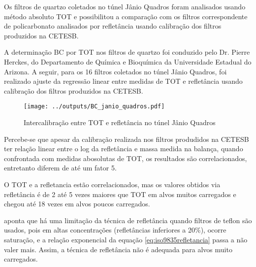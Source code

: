 Os filtros de quartzo coletados no túnel Jânio Quadros foram analisados usando
método absoluto TOT e possibilitou a comparação com os filtros correspondente 
de policarbonato analisados por refletância usando calibração dos filtros
produzidos na CETESB. 

A determinação BC por TOT nos filtros de quartzo foi conduzido pelo 
Dr. Pierre Herckes, do Departamento de Química e Bioquímica da 
Universidade Estadual do Arizona. A seguir, para os 16 filtros coletados no 
túnel Jânio Quadros, foi realizado ajuste da regressão linear
entre medidas de TOT e refletância usando calibração dos filtros produzidos na 
CETESB.

\begin{figure}
  \centering
  \begin{minipage}[b]{0.5\linewidth}
    \texttt{[image: ../outputs/BC\_janio\_quadros.pdf]}
    \caption{Intercalibração entre TOT e refletância no túnel Jânio Quadros}
  \end{minipage}%
  \hspace{0.5cm}
  \begin{minipage}[b]{0.45\linewidth}
    \begin{small}
      
    \end{small}
  \end{minipage}
\end{figure}

Percebe-se que apesar da calibração realizada nos filtros produdidos na CETESB
ter relação linear entre o log da refletância e massa medida na balança, quando
confrontada com medidas abosolutas de TOT, os resultados são correlacionados, 
entretanto diferem de até um fator 5. 

O TOT e a refletancia estão correlacionados, mas os valores obtidos via 
refletância é de 2 até 5 vezes maiores que TOT em alvos muitos carregados e 
chegou até 18 vezes em alvos poucos carregados.

\citet{taha2007} aponta que há uma limitação da técnica de refletância quando 
filtros de teflon são usados, pois em altas concentrações (refletâncias
inferiores a 20\%), ocorre saturação, e a relação exponencial da equação 
\ref{eq:iso9835refletancia} passa a não valer mais. Assim, a técnica de
refletância não é adequada para alvos muito carregados.

